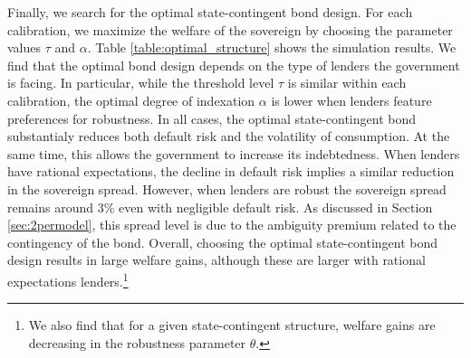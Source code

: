 Finally, we search for the optimal state-contingent bond design. For each calibration, we maximize the welfare of the sovereign by choosing the parameter values $\tau$ and $\alpha$. Table \ref{table:optimal_structure} shows the simulation results. We find that the optimal bond design depends on the type of lenders the government is facing. In particular, while the threshold level $\tau$ is similar within each calibration, the optimal degree of indexation $\alpha$ is lower when lenders feature preferences for robustness. In all cases, the optimal state-contingent bond substantialy reduces both default risk and the volatility of consumption. At the same time, this allows the government to increase its indebtedness. When lenders have rational expectations, the decline in default risk implies a similar reduction in the sovereign spread. However, when lenders are robust the sovereign spread remains around 3\% even with negligible default risk. As discussed in Section \ref{sec:2permodel}, this spread level is due to the ambiguity premium related to the contingency of the bond. Overall, choosing the optimal state-contingent bond design results in large welfare gains, although these are larger with rational expectations lenders.\footnote{We also find that for a given state-contingent structure, welfare gains are decreasing in the robustness parameter $\theta$.}

